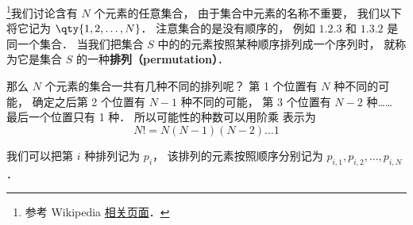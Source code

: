 
\begin{issues}
\issueDraft
\end{issues}


\footnote{参考 Wikipedia \href{https://en.wikipedia.org/wiki/Permutation}{相关页面}．}我们讨论含有 $N$ 个元素的任意集合， 由于集合中元素的名称不重要， 我们以下将它记为 $\qty{1,2,\dots, N}$． 注意集合的是没有顺序的， 例如 $\qty{1,2,3}$ 和 $\qty{1,3,2}$ 是同一个集合． 当我们把集合 $S$ 中的的元素按照某种顺序排列成一个序列时， 就称为它是集合 $S$ 的一种\textbf{排列（permutation）}．

那么 $N$ 个元素的集合一共有几种不同的排列呢？ 第 1 个位置有 $N$ 种不同的可能， 确定之后第 2 个位置有 $N-1$ 种不同的可能， 第 3 个位置有 $N-2$ 种…… 最后一个位置只有 1 种． 所以可能性的种数可以用阶乘 表示为
\begin{equation}
N! = N(N-1)(N-2)\dots 1
\end{equation}

我们可以把第 $i$ 种排列记为 $p_i$， 该排列的元素按照顺序分别记为 $p_{i,1}, p_{i,2}, \dots, p_{i,N}$．
